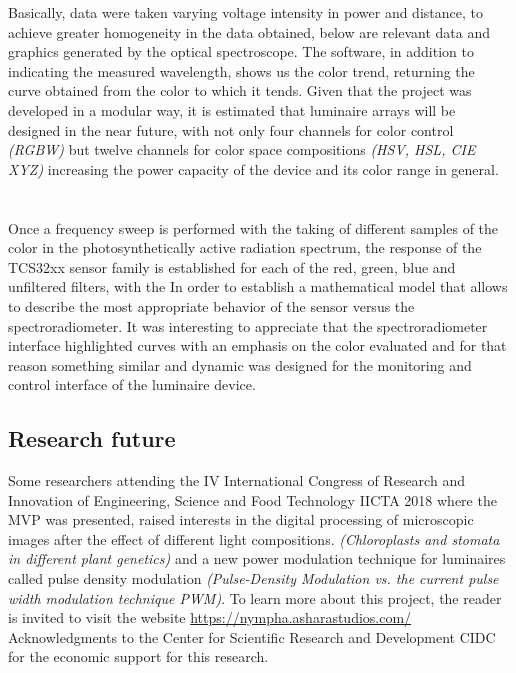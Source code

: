 \documentclass[letterpaper,12pt,twoside]{articleingud}
\begin{document}
Basically, data were taken varying voltage intensity in power and distance, to achieve greater homogeneity in the data obtained, below are relevant data and graphics generated by the optical spectroscope. The software, in addition to indicating the measured wavelength, shows us the color trend, returning the curve obtained from the color to which it tends.
Given that the project was developed in a modular way, it is estimated that luminaire arrays will be designed in the near future, with not only four channels for color control \textit{(RGBW)} but twelve channels for color space compositions \textit{(HSV, HSL, CIE XYZ)} increasing the power capacity of the device and its color range in general.
\\\\\\
Once a frequency sweep is performed with the taking of different samples of the color in the photosynthetically active radiation spectrum, the response of the TCS32xx sensor family is established for each of the red, green, blue and unfiltered filters, with the In order to establish a mathematical model that allows to describe the most appropriate behavior of the sensor versus the spectroradiometer.
It was interesting to appreciate that the spectroradiometer interface highlighted curves with an emphasis on the color evaluated and for that reason something similar and dynamic was designed for the monitoring and control interface of the luminaire device.

\subsection{Research future}
Some researchers attending the IV International Congress of Research and Innovation of Engineering, Science and Food Technology IICTA 2018 where the MVP was presented, raised interests in the digital processing of microscopic images after the effect of different light compositions. \textit{(Chloroplasts and stomata in different plant genetics)} and a new power modulation technique for luminaires called pulse density modulation \textit{(Pulse-Density Modulation vs. the current pulse width modulation technique PWM)}. To learn more about this project, the reader is invited to visit the website \url{https://nympha.asharastudios.com/}
Acknowledgments to the Center for Scientific Research and Development CIDC for the economic support for this research.
\end{document}
